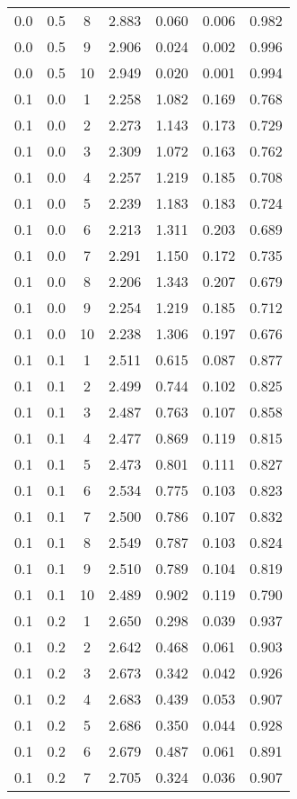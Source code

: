 \begin{tabular}{|c|c|c|c|c|c|c|}
0.0 & 0.5 & 8 & 2.883 & 0.060 & 0.006 & 0.982 \\
0.0 & 0.5 & 9 & 2.906 & 0.024 & 0.002 & 0.996 \\
0.0 & 0.5 & 10 & 2.949 & 0.020 & 0.001 & 0.994 \\
0.1 & 0.0 & 1 & 2.258 & 1.082 & 0.169 & 0.768 \\
0.1 & 0.0 & 2 & 2.273 & 1.143 & 0.173 & 0.729 \\
0.1 & 0.0 & 3 & 2.309 & 1.072 & 0.163 & 0.762 \\
0.1 & 0.0 & 4 & 2.257 & 1.219 & 0.185 & 0.708 \\
0.1 & 0.0 & 5 & 2.239 & 1.183 & 0.183 & 0.724 \\
0.1 & 0.0 & 6 & 2.213 & 1.311 & 0.203 & 0.689 \\
0.1 & 0.0 & 7 & 2.291 & 1.150 & 0.172 & 0.735 \\
0.1 & 0.0 & 8 & 2.206 & 1.343 & 0.207 & 0.679 \\
0.1 & 0.0 & 9 & 2.254 & 1.219 & 0.185 & 0.712 \\
0.1 & 0.0 & 10 & 2.238 & 1.306 & 0.197 & 0.676 \\
0.1 & 0.1 & 1 & 2.511 & 0.615 & 0.087 & 0.877 \\
0.1 & 0.1 & 2 & 2.499 & 0.744 & 0.102 & 0.825 \\
0.1 & 0.1 & 3 & 2.487 & 0.763 & 0.107 & 0.858 \\
0.1 & 0.1 & 4 & 2.477 & 0.869 & 0.119 & 0.815 \\
0.1 & 0.1 & 5 & 2.473 & 0.801 & 0.111 & 0.827 \\
0.1 & 0.1 & 6 & 2.534 & 0.775 & 0.103 & 0.823 \\
0.1 & 0.1 & 7 & 2.500 & 0.786 & 0.107 & 0.832 \\
0.1 & 0.1 & 8 & 2.549 & 0.787 & 0.103 & 0.824 \\
0.1 & 0.1 & 9 & 2.510 & 0.789 & 0.104 & 0.819 \\
0.1 & 0.1 & 10 & 2.489 & 0.902 & 0.119 & 0.790 \\
0.1 & 0.2 & 1 & 2.650 & 0.298 & 0.039 & 0.937 \\
0.1 & 0.2 & 2 & 2.642 & 0.468 & 0.061 & 0.903 \\
0.1 & 0.2 & 3 & 2.673 & 0.342 & 0.042 & 0.926 \\
0.1 & 0.2 & 4 & 2.683 & 0.439 & 0.053 & 0.907 \\
0.1 & 0.2 & 5 & 2.686 & 0.350 & 0.044 & 0.928 \\
0.1 & 0.2 & 6 & 2.679 & 0.487 & 0.061 & 0.891 \\
0.1 & 0.2 & 7 & 2.705 & 0.324 & 0.036 & 0.907 \\

\end{tabular}
